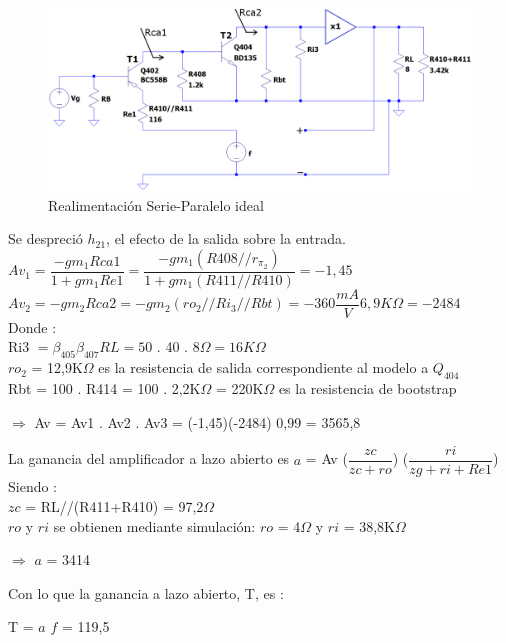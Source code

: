 \documentclass[12pt]{book}
\begin{document}
\begin{figure}[H]
\centering
\includegraphics[scale=0.4]{figuras/2-lazoCerradoIdeal.png}
\caption{Realimentación Serie-Paralelo ideal}
\label{figura2-2}
\end{figure}
Se despreció $h_{21}$, el efecto de la salida sobre la entrada.\\[0.5cm]
$Av_{1} = \dfrac{-gm_{1}Rca1}{1+gm_{1} Re1} = \dfrac{-gm_{1}(R408//r_{\pi_2})}{1+gm_{1}(R411//R410)} = -1,45$\\
$Av_{2} = -gm_{2}Rca2 = -gm_{2}(ro_{2}//Ri_{3}//Rbt) = -360\dfrac{mA}{V} 6,9K\Omega = -2484$\\[0.5cm]
Donde :\\
Ri3 $=\beta_{405} \beta_{407} RL = 50$ . 40 . $8\Omega = 16K\Omega$\\
$ro_{2}$ = 12,9K$\Omega$ es la resistencia de salida correspondiente al modelo a $Q_{404}$\\
Rbt = 100 . R414 = 100 . 2,2K$\Omega$ = 220K$\Omega$ es la resistencia de bootstrap
\begin{center}
$\Longrightarrow$   Av = Av1 . Av2 . Av3 = (-1,45)(-2484) 0,99 = 3565,8\\
\end{center}
La ganancia del amplificador a lazo abierto es  $a$ = Av ($\dfrac{zc}{zc+ro}$) ($\dfrac{ri}{zg+ri+Re1}$)\\
Siendo :\\
$zc$ = RL//(R411+R410) = 97,2$\Omega$\\
$ro$ y $ri$ se obtienen mediante simulación: $ro$ = 4$\Omega$ y $ri$ = 38,8K$\Omega$
\begin{center}
$\Longrightarrow$   $a$ = 3414\\
\end{center}
Con lo que la ganancia a lazo abierto, T, es :
\begin{center}
T = $a$ $f$ = 119,5\\
\end{center}
\end{document}
